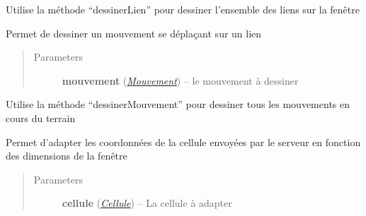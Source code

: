 \documentclass[letterpaper,10pt,english]{sphinxmanual}
\begin{document}
\begin{fulllineitems}
\begin{fulllineitems}
\end{fulllineitems}


\begin{fulllineitems}
\label{index:Graphique.Graphique.dessinerLiens}
Utilise la méthode ``dessinerLien'' pour dessiner l'ensemble des liens sur la fenêtre

\end{fulllineitems}


\begin{fulllineitems}
\label{index:Graphique.Graphique.dessinerMouvement}
Permet de dessiner un mouvement se déplaçant sur un lien
\begin{quote}\begin{description}
\item[{Parameters}] \leavevmode
\textbf{mouvement} ({\hyperref[index:module-Mouvement]{\emph{Mouvement}}}) -- le mouvement à dessiner

\end{description}\end{quote}

\end{fulllineitems}


\begin{fulllineitems}
\label{index:Graphique.Graphique.dessinerMouvements}
Utilise la méthode ``dessinerMouvement'' pour dessiner tous les mouvements en cours du terrain

\end{fulllineitems}


\begin{fulllineitems}
\label{index:Graphique.Graphique.getTrueCoordonneeCellule}
Permet d'adapter les coordonnées de la cellule envoyées par le serveur en fonction des dimensions de la fenêtre
\begin{quote}\begin{description}
\item[{Parameters}] \leavevmode
\textbf{cellule} ({\hyperref[index:module-Cellule]{\emph{Cellule}}}) -- La cellule à adapter


\end{description}
\end{quote}
\end{fulllineitems}
\end{fulllineitems}
\end{document}
